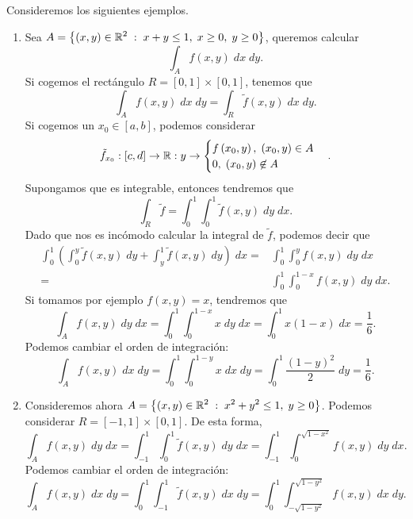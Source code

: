 \begin{eg}
	Consideremos los siguientes ejemplos.
	\begin{enumerate}
	\item Sea $\displaystyle A = \left\{ \left(x,y\right) \in \mathbb{R}^{2} \; : \; x + y\leq1,\; x \geq 0, \; y \geq 0\right\}  $, queremos calcular
	\[\int _{A}f\left(x,y\right) \; dx \; dy .\]
	Si cogemos el rectángulo $\displaystyle R = \left[0,1\right] \times\left[0,1\right]  $, tenemos que
	\[\int _{A}f\left(x,y\right) \; dx \; dy = \int _{R}\tilde{f}\left(x,y\right) \; dx \; dy .\]
	Si cogemos un $\displaystyle x_{0} \in \left[a,b\right]  $, podemos considerar  
	\[ \tilde{f}_{x_{0}} : \left[c,d\right] \to \mathbb{R}: y \to 
	\begin{cases}
	f\left(x_{0}, y\right), \; \left(x_{0}, y \right)\in A \\
	0, \; \left(x_{0}, y \right)\not\in A
	\end{cases}
	.\]
Supongamos que es integrable, entonces tendremos que 
\[\int _{R}\tilde{f} = \int^{1}_{0} \int^{1}_{0} \tilde{f}\left(x,y\right) \; dy \; dx .\]
Dado que nos es incómodo calcular la integral de $\displaystyle \tilde{f} $, podemos decir que 
\[
\begin{split}
	\int^{1}_{0} \left(\int^{y}_{0} \tilde{f}\left(x,y\right) \; dy + \int^{1}_{y} \tilde{f}\left(x,y\right) \; dy\right) \; dx = & \int^{1}_{0} \int^{y}_{0} f\left(x,y\right) \; dy \; dx \\
	= &  \int^{1}_{0} \int^{1-x}_{0} f\left(x,y\right) \; dy \; dx.
\end{split}
\]
Si tomamos por ejemplo $\displaystyle f\left(x,y\right)= x $, tendremos que 
\[\int _{A}f\left(x,y\right) \; dy \; dx = \int^{1}_{0} \int^{1-x}_{0} x \; dy \; dx = \int^{1}_{0} x\left(1-x\right) \; dx = \frac{1}{6} .\]
Podemos cambiar el orden de integración:
\[\int _{A}f\left(x,y\right) \; dx \; dy = \int^{1}_{0} \int^{1-y}_{0} x \; dx \; dy=\int^{1}_{0} \frac{\left(1-y\right)^{2}}{2} \; dy = \frac{1}{6} .\]
\item Consideremos ahora $\displaystyle A = \left\{ \left(x,y\right) \in \mathbb{R}^{2} \; : \; x^{2} + y^{2} \leq 1, \; y \geq 0\right\}  $. Podemos considerar $\displaystyle R = \left[-1,1\right] \times \left[0,1\right]  $. De esta forma, 
	\[\int _{A}f\left(x,y\right) \; dy \; dx = \int^{1}_{-1} \int^{1}_{0} \tilde{f}\left(x,y\right) \; dy \; dx = \int^{1}_{-1} \int^{\sqrt{1-x^{2}}}_{0} f\left(x,y\right) \; dy \; dx .\]
	Podemos cambiar el orden de integración:
	\[\int _{A}f\left(x,y\right) \; dx \; dy = \int^{1}_{0} \int^{1}_{-1} \tilde{f}\left(x,y\right) \; dx \; dy = \int^{1}_{0} \int^{\sqrt{1-y^{2}}}_{-\sqrt{1-y^{2}}}  f\left(x,y\right)\; dx \; dy.\]
	\end{enumerate}
\end{eg}


